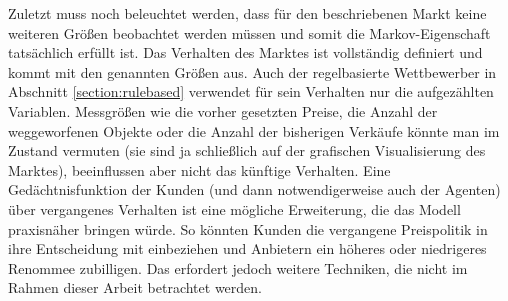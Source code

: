 Zuletzt muss noch beleuchtet werden, dass für den beschriebenen Markt keine weiteren Größen beobachtet werden müssen und somit die Markov-Eigenschaft tatsächlich erfüllt ist.
Das Verhalten des Marktes ist vollständig definiert und kommt mit den genannten Größen aus.
Auch der regelbasierte Wettbewerber in Abschnitt \ref{section:rulebased} verwendet für sein Verhalten nur die aufgezählten Variablen.
Messgrößen wie die vorher gesetzten Preise, die Anzahl der weggeworfenen Objekte oder die Anzahl der bisherigen Verkäufe könnte man im Zustand vermuten (sie sind ja schließlich auf der grafischen Visualisierung des Marktes), beeinflussen aber nicht das künftige Verhalten.
Eine Gedächtnisfunktion der Kunden (und dann notwendigerweise auch der Agenten) über vergangenes Verhalten ist eine mögliche Erweiterung, die das Modell praxisnäher bringen würde.
So könnten Kunden die vergangene Preispolitik in ihre Entscheidung mit einbeziehen und Anbietern ein höheres oder niedrigeres Renommee zubilligen.
Das erfordert jedoch weitere Techniken, die nicht im Rahmen dieser Arbeit betrachtet werden.

